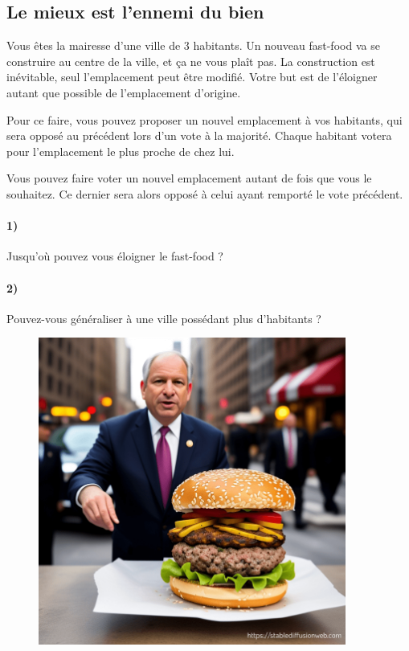 \documentclass[a4paper,10pt,oneside]{article}
\begin{document}
\newpage
\subsection{Le mieux est l'ennemi du bien}

Vous êtes la mairesse d'une ville de 3 habitants.
Un nouveau fast-food va se construire au centre de la ville, et ça ne vous plaît pas.
La construction est inévitable, seul l'emplacement peut être modifié.
Votre but est de l'éloigner autant que possible de l'emplacement d'origine.

Pour ce faire, vous pouvez proposer un nouvel emplacement à vos habitants, qui sera opposé au précédent lors d'un vote à la majorité.
Chaque habitant votera pour l'emplacement le plus proche de chez lui.

Vous pouvez faire voter un nouvel emplacement autant de fois que vous le souhaitez.
Ce dernier sera alors opposé à celui ayant remporté le vote précédent.


\paragraph*{1)} 
Jusqu'où pouvez vous éloigner le fast-food ?

\paragraph*{2)} 
Pouvez-vous généraliser à une ville possédant plus d'habitants ?


\vspace{3cm}
\begin{figure}[!ht]
  \centering
  \includegraphics[width=0.9\textwidth]{figures/fast-food.png}
\end{figure}
\end{document}
